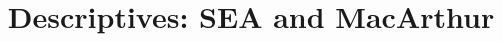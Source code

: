 \documentclass{article}
\title{Descriptives: SEA and MacArthur}
\newenvironment{knitrout}{}{}  %
\begin{document}
\begin{knitrout}

\maketitle
\tableofcontents
\end{document}
